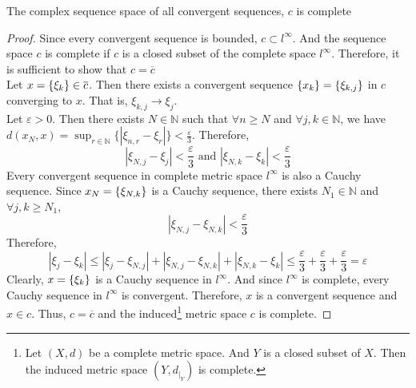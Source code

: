 \begin{theorem}
	The complex sequence space of all convergent sequences, $c$ is complete
\end{theorem}
\begin{proof}
	Since every convergent sequence is bounded, $c \subset l^\infty$.
	And the sequence space $c$ is complete if $c$ is a closed subset of the complete space $l^\infty$.
	Therefore, it is sufficient to show that $c = \overline{c}$\\

	Let $x = \{\xi_k\} \in \overline{c}$.	
	Then there exists a convergent sequence $\{x_k\} = \{\xi_{k,j}\}$ in $c$ converging to $x$.
	That is, $\xi_{k,j} \to \xi_j$.\\

	Let $\varepsilon > 0$.
	Then there exists $N \in \mathbb{N}$ such that $\forall n \ge N$ and $\forall j,k \in \mathbb{N}$, we have $\displaystyle d(x_N,x) = \sup_{r \in \mathbb{N}} \{ |\xi_{n,r} - \xi_r| \} < \frac{\varepsilon}{3}$.
	Therefore,
	\begin{equation}
		|\xi_{N,j} - \xi_j| < \frac{\varepsilon}{3} \text{ and } |\xi_{N,k} - \xi_k| < \frac{\varepsilon}{3} 
	\end{equation}
	Every convergent sequence in complete metric space $l^\infty$ is also a Cauchy sequence.
	Since $x_N = \{\xi_{N,k}\}$ is a Cauchy sequence, there exists $N_1 \in \mathbb{N}$ and $\forall j,k \ge N_1$,
	\begin{equation}
		|\xi_{N,j} - \xi_{N,k}| < \frac{\varepsilon}{3}
	\end{equation}
	Therefore,
	$$|\xi_j - \xi_k| \le |\xi_j - \xi_{N,j}| + |\xi_{N,j}-\xi_{N,k}| + |\xi_{N,k} - \xi_k| \le \frac{\varepsilon}{3} + \frac{\varepsilon}{3} + \frac{\varepsilon}{3} = \varepsilon $$
	Clearly, $x = \{\xi_k\}$ is a Cauchy sequence in $l^\infty$.
	And since $l^\infty$ is complete, every Cauchy sequence in $l^\infty$ is convergent.
	Therefore, $x$ is a convergent sequence and $x \in c$.
	Thus, $c = \overline{c}$ and the induced\dag\footnote{
		Let $(X,d)$ be a complete metric space.
		And $Y$ is a closed subset of $X$.
		Then the induced metric space $(Y,d_{|_Y})$ is complete.}
	metric space $c$ is complete.
\end{proof}

